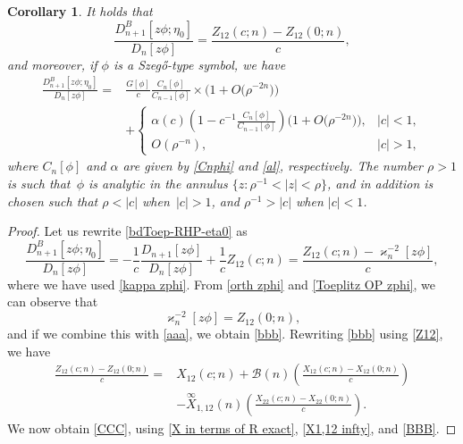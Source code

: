\documentclass[10pt,a4paper]{amsart}
\numberwithin{equation}{section}
\newtheorem{Corollary}[Theorem]{Corollary}
\newcommand{\al}{\alpha}
\newcommand{\di}{\displaystyle}
\begin{document}
		\begin{Corollary}\label{Corollary zphi/z-c}
			It holds that
			\begin{equation}\label{bbb}
				\frac{D^{B}_{n+1}[z\phi;\eta_0]}{D_{n}[z\phi]} = \frac{Z_{12}(c;n) - Z_{12}(0;n)}{c},
			\end{equation}
			and moreover, if $\phi$ is a Szeg\H{o}-type symbol, we have
			\begin{align}
					\frac{D^{B}_{n+1}[z\phi;\eta_0]}{D_{n}[z\phi]} ={}& \di \frac{G[\phi]}{c} \frac{C_n[\phi]}{C_{n-1}[\phi]} \times \big(1 + O\big(\rho^{-2n}\big)\big)\nonumber \\
 & + \begin{cases}
						\al(c)\left(	1 - \di c^{-1} \frac{C_n[\phi]}{C_{n-1}[\phi]} \right) \big(1 + O\big(\rho^{-2n}\big)\big), & |c|<1, \\
						O(\rho^{-n})	, & |c|>1,
					\end{cases}\label{CCC}
			\end{align}
			where $C_n[\phi]$ and
			$\al$ are given by \eqref{Cnphi} and \eqref{al}, respectively. The number $\rho>1$ is such that~$\phi$ is analytic in the annulus $\big\{z\colon \rho^{-1}<|z|<\rho\big\}$, and in addition is chosen such that $\rho < |c|$ when~${|c|>1}$, and $\rho^{-1} > |c|$ when $|c|<1$.
		\end{Corollary}
		\begin{proof}
			Let us rewrite \eqref{bdToep-RHP-eta0} as
			\begin{equation}\label{aaa}
				\frac{D^{B}_{n+1}[z\phi;\eta_0]}{D_{n}[z\phi]} = - \frac{1}{c} \frac{D_{n+1}[z\phi]}{D_{n}[z\phi]} + \frac{1}{c} Z_{12}(c;n) = \frac{Z_{12}(c;n)-\varkappa_n^{-2}[z\phi]}{c},
			\end{equation}
			where we have used \eqref{kappa zphi}. From \eqref{orth zphi} and \eqref{Toeplitz OP zphi}, we can observe that
			\begin{equation*}
				\varkappa_n^{-2}[z\phi] = Z_{12}(0;n),
			\end{equation*}
			and if we combine this with \eqref{aaa}, we obtain \eqref{bbb}. Rewriting \eqref{bbb}
			using \eqref{Z12}, we have
			\begin{align*}
				\frac{Z_{12}(c;n) - Z_{12}(0;n)}{c} ={}& X_{12}(c;n) + \mathscr{B}(n) \left( \frac{X_{12}(c;n) - X_{12}(0;n)}{c} \right) \\ & -\overset{\infty}{X}_{1,12}(n) \left( \frac{X_{22}(c;n) - X_{22}(0;n)}{c} \right).
			\end{align*}
			We now obtain \eqref{CCC}, using \eqref{X in terms of R exact}, \eqref{X1,12 infty}, and \eqref{BBB}.
		\end{proof}
		
\end{document}
